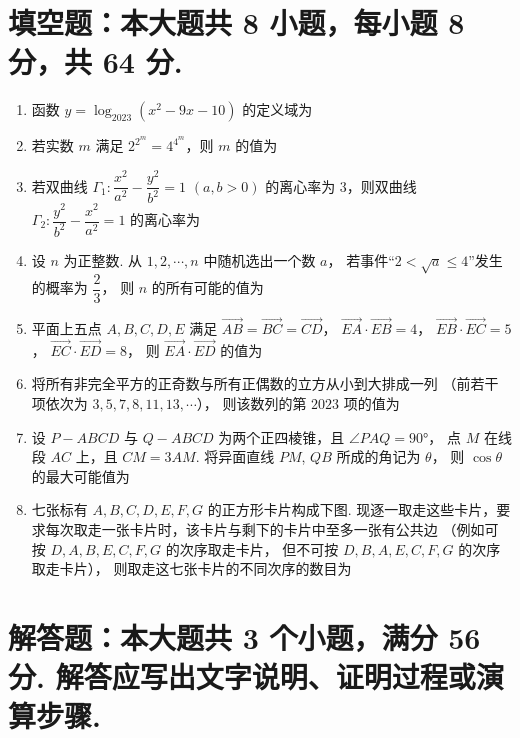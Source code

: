 \documentclass{chsmc}
\begin{document}
\section{填空题：本大题共 8 小题，每小题 8 分，共 64 分.}

\begin{enumerate}
  \item 函数 $y = \log_{2023}(x^2 - 9x - 10)$ 的定义域为 \blankline
  \item 若实数 $m$ 满足 $2^{2^m} = 4^{4^m}$，则 $m$ 的值为 \blankline
  \item 若双曲线 $\Gamma_1\colon \dfrac{x^2}{a^2} - \dfrac{y^2}{b^2} = 1$
    $(a, b > 0)$ 的离心率为 $3$，则双曲线
    $\Gamma_2\colon \dfrac{y^2}{b^2} - \dfrac{x^2}{a^2} = 1$ 的离心率为 \blankline
  \item 设 $n$ 为正整数. 从 $1, 2, \cdots, n$ 中随机选出一个数 $a$，
    若事件“$2 < \sqrt{a} \leqslant 4$”发生的概率为 $\dfrac{2}{3}$，
    则 $n$ 的所有可能的值为 \blankline
  \item 平面上五点 $A, B, C, D, E$ 满足
    $\overrightarrow{AB} = \overrightarrow{BC} = \overrightarrow{CD}$，
    $\overrightarrow{EA}\cdot\overrightarrow{EB} = 4$，
    $\overrightarrow{EB}\cdot\overrightarrow{EC} = 5$，
    $\overrightarrow{EC}\cdot\overrightarrow{ED} = 8$，
    则 $\overrightarrow{EA}\cdot\overrightarrow{ED}$ 的值为 \blankline
  \item 将所有非完全平方的正奇数与所有正偶数的立方从小到大排成一列
    （前若干项依次为 $3, 5, 7, 8, 11, 13, \cdots$），
    则该数列的第 $2023$ 项的值为 \blankline
  \item 设 $P-ABCD$ 与 $Q-ABCD$ 为两个正四棱锥，且 $\angle PAQ = 90°$，
    点 $M$ 在线段 $AC$ 上，且 $CM = 3AM$. 将异面直线 $PM$, $QB$ 所成的角记为 $\theta$，
    则 $\cos\theta$ 的最大可能值为 \blankline
  \item 七张标有 $A, B, C, D, E, F, G$ 的正方形卡片构成下图.
    现逐一取走这些卡片，要求每次取走一张卡片时，该卡片与剩下的卡片中至多一张有公共边
    （例如可按 $D, A, B, E, C, F, G$ 的次序取走卡片，
    但不可按 $D, B, A, E, C, F, G$ 的次序取走卡片），
    则取走这七张卡片的不同次序的数目为 \blankline
\end{enumerate}

\section{解答题：本大题共 3 个小题，满分 56 分. 解答应写出文字说明、证明过程或演算步骤.}
\end{document}
